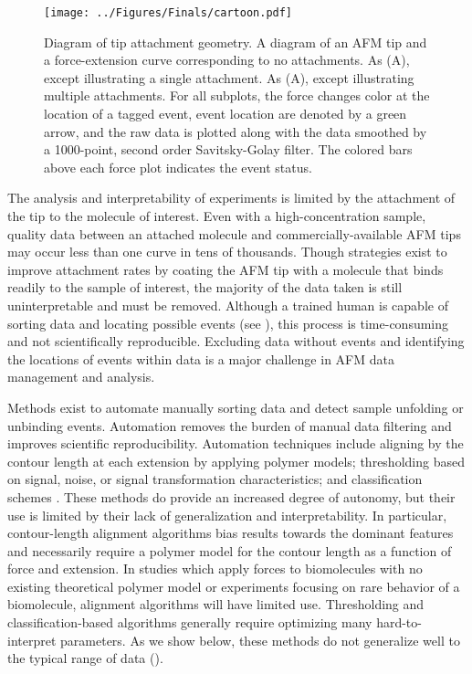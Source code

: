 \begin{figure}[htpb]
\caption[Diagram of AFM attachment geometry]{Diagram of tip attachment geometry.  A diagram of an AFM tip and a force-extension curve corresponding to no attachments.  As (A), except illustrating a single attachment.  As (A), except illustrating multiple attachments. For all subplots, the force changes color at the location of a tagged event, event location are denoted by a green arrow, and the raw data is plotted along with the data smoothed by a 1000-point, second order Savitsky-Golay filter. The colored bars above each force plot indicates the event status.}
\centering
\texttt{[image: ../Figures/Finals/cartoon.pdf]}%
\end{figure}
The analysis and interpretability of \singlemol{} experiments is limited by the attachment of the tip to the molecule of interest. Even with a high-concentration sample, quality \singlemol{} data between an attached molecule and commercially-available AFM tips may occur less than one curve in tens of thousands. Though strategies exist to improve attachment rates by coating the AFM tip with a molecule that binds readily to the sample of interest,\cite{walder_robert_rapid_nodate} the majority of the data taken is still uninterpretable and must be removed. Although a trained human is capable of sorting \singlemol{} data and locating possible events (see ), this process is time-consuming and not scientifically reproducible. Excluding data without events and identifying the locations of events within data is a major challenge in AFM data management and analysis.

Methods exist to automate manually sorting \singlemol{} data and detect sample unfolding or unbinding events. Automation removes the burden of manual data filtering and improves scientific reproducibility. Automation techniques include aligning by the contour length at each extension by applying polymer models; thresholding based on signal, noise, or signal transformation characteristics; and classification schemes . These methods do provide an increased degree of autonomy, but their use is limited by their lack of generalization and interpretability. In particular, contour-length alignment algorithms bias results towards the dominant features and necessarily require a polymer model for the contour length as a function of force and extension. In \singlemol{} studies which apply forces to biomolecules with no existing theoretical polymer model or experiments focusing on rare behavior of a biomolecule, alignment algorithms will have limited use.  Thresholding and classification-based algorithms generally require optimizing many hard-to-interpret parameters. As we show below, these methods do not generalize well to the typical range of \singlemol{} data ().

